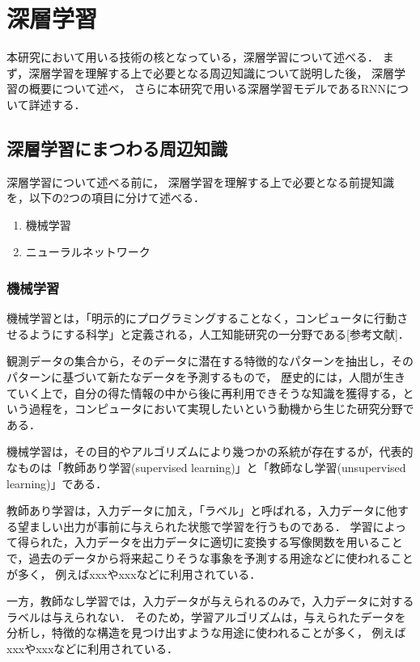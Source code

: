 \section{深層学習}

本研究において用いる技術の核となっている，深層学習について述べる．
まず，深層学習を理解する上で必要となる周辺知識について説明した後，
深層学習の概要について述べ，
さらに本研究で用いる深層学習モデルであるRNNについて詳述する．

\subsection{深層学習にまつわる周辺知識}
深層学習について述べる前に，
深層学習を理解する上で必要となる前提知識を，以下の2つの項目に分けて述べる．

\begin{enumerate}
	\item 機械学習
	\item ニューラルネットワーク
\end{enumerate}

\subsubsection{機械学習}
機械学習とは，「明示的にプログラミングすることなく，コンピュータに行動させるようにする科学」と定義される，人工知能研究の一分野である[参考文献]．

観測データの集合から，そのデータに潜在する特徴的なパターンを抽出し，そのパターンに基づいて新たなデータを予測するもので，
歴史的には，人間が生きていく上で，自分の得た情報の中から後に再利用できそうな知識を獲得する，という過程を，コンピュータにおいて実現したいという動機から生じた研究分野である．


機械学習は，その目的やアルゴリズムにより幾つかの系統が存在するが，代表的なものは「教師あり学習(supervised learning)」と「教師なし学習(unsupervised learning)」である．

教師あり学習は，入力データに加え，「ラベル」と呼ばれる，入力データに他する望ましい出力が事前に与えられた状態で学習を行うものである．
学習によって得られた，入力データを出力データに適切に変換する写像関数を用いることで，過去のデータから将来起こりそうな事象を予測する用途などに使われることが多く，
例えばxxxやxxxなどに利用されている．

一方，教師なし学習では，入力データが与えられるのみで，入力データに対するラベルは与えられない．
そのため，学習アルゴリズムは，与えられたデータを分析し，特徴的な構造を見つけ出すような用途に使われることが多く，
例えばxxxやxxxなどに利用されている．



